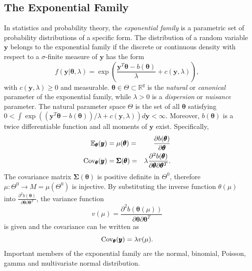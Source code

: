 \subsection{The Exponential Family}
In statistics and probability theory, the \textit{exponential family} is a parametric set of probability distributions of a specific form. The distribution of a random variable $\pmb{y}$ belongs to the exponential family if the discrete or continuous density with respect to a $\sigma$-finite measure of $\pmb{y}$ has the form
\begin{equation}
    f(\pmb{y}|\pmb{\theta}, \lambda)=\exp\left(\frac{\pmb{y}^T\pmb{\theta} - b(\pmb{\theta})}{\lambda}+c(\pmb{y},\lambda) \right),
\end{equation}
with $c(\pmb{y},\lambda)\geq 0$ and measurable. $\pmb{\theta}\in\Theta\subset\mathbb{R}^q$ is the \textit{natural} or \textit{canonical} parameter of the exponential family, while $\lambda > 0$ is a \textit{dispersion} or \textit{nuisance} parameter. The natural parameter space $\Theta$ is the set of all $\pmb{\theta}$ satisfying $0<\int\exp\left(\left(\pmb{y}^T\pmb{\theta} - b(\pmb{\theta})\right)/\lambda+c(\pmb{y},\lambda) \right)d\pmb{y}< \infty$. Moreover, $b(\pmb{\theta})$ is a twice differentiable  function and all moments of $\pmb{y}$ exist. Specifically, 
\begin{alignat}{3}
    \mathbb{E}_{\pmb{\theta}}(\pmb{y}) &= \mu(\pmb{\theta}) =& \frac{\partial b(\pmb{\theta})}{\partial\pmb{\theta}} \\
    \hbox{Cov}_{\pmb{\theta}}(\pmb{y}) &= \pmb{\Sigma}(\pmb{\theta}) =& \lambda\frac{\partial^2b(\pmb{\theta})}{\partial\pmb{\theta}\partial\pmb{\theta}^T}.
\end{alignat}
The covariance matrix $\pmb{\Sigma}(\pmb{\theta})$ is positive definite in $\Theta^0$, therefore $\mu:\Theta^0\rightarrow  M = \mu\left(\Theta^0\right)$ is injective. By substituting the inverse function $\theta(\mu)$ into $\frac{\partial^2b(\pmb{\theta})}{\partial\pmb{\theta}\partial\pmb{\theta}^T}$, the variance function 
\begin{equation}
    v(\mu)=\frac{\partial^2b(\pmb{\theta}(\mu))}{\partial\pmb{\theta}\partial\pmb{\theta}^T}
\end{equation}
is given and the covariance can be written as
\begin{equation}
    \hbox{Cov}_{\pmb{\theta}}(\pmb{y}) = \lambda v(\mu).
\end{equation}
Important members of the exponential family are the normal, binomial, Poisson, gamma and multivariate normal distribution\autocite[Cf.][]{fahrmeir2013multivariate}.

